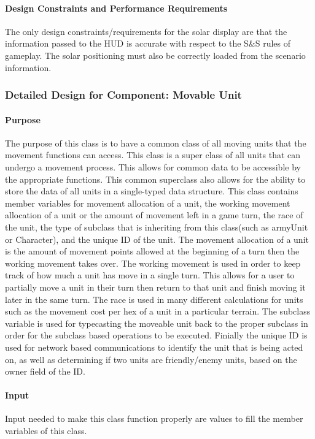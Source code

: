 \documentclass[12pt,a4paper,titlepage]{article}
\begin{document}
\paragraph{Design Constraints and Performance Requirements} The only design constraints/requirements for the solar display are that the information passed to the HUD is accurate with respect to the S\&S rules of gameplay. The solar positioning must also be correctly loaded from the scenario information. 

\subsubsection{Detailed Design for Component: Movable Unit}
\paragraph{Purpose} The purpose of this class is to have a common class of all moving units that the movement functions can access. This class is a super class of all units that can undergo a movement process. This allows for common data to be accessible by the appropriate functions. This common superclass also allows for the ability to store the data of all units in a single-typed data structure. This class contains member variables for movement allocation of a unit, the working movement allocation of a unit or the amount of movement left in a game turn, the race of the unit, the type of subclass that is inheriting from this class(such as armyUnit or Character), and the unique ID of the unit. The movement allocation of a unit is the amount of movement points allowed at the beginning of a turn then the working movement takes over. The working movement is used in order to keep track of how much a unit has move in a single turn. This allows for a user to partially move a unit in their turn then return to that unit and finish moving it later in the same turn. The race is used in many different calculations for units such as the movement cost per hex of a unit in a particular terrain. The subclass variable is used for typecasting the moveable unit back to the proper subclass in order for the subclass based operations to be executed. Finially the unique ID is used for network based communications to identify the unit that is being acted on, as well as determining if two units are friendly/enemy units, based on the owner field of the ID. 
\paragraph{Input} Input needed to make this class function properly are values to fill the member variables of this class. 
\end{document}
